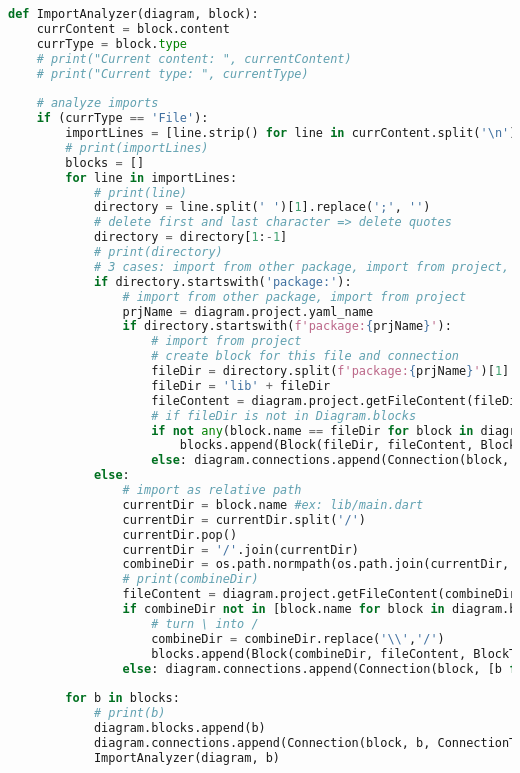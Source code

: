 \begin{lstlisting}[language=Python, caption={$\texttt{ImportAnalyzer}$ function.}, label={lst:9}]
def ImportAnalyzer(diagram, block):
    currContent = block.content
    currType = block.type
    # print("Current content: ", currentContent)
    # print("Current type: ", currentType)
    
    # analyze imports
    if (currType == 'File'):
        importLines = [line.strip() for line in currContent.split('\n') if line.strip().startswith('import')]
        # print(importLines)
        blocks = []
        for line in importLines:
            # print(line)
            directory = line.split(' ')[1].replace(';', '')
            # delete first and last character => delete quotes
            directory = directory[1:-1]
            # print(directory)
            # 3 cases: import from other package, import from project, import as relative path
            if directory.startswith('package:'):
                # import from other package, import from project
                prjName = diagram.project.yaml_name
                if directory.startswith(f'package:{prjName}'):
                    # import from project
                    # create block for this file and connection
                    fileDir = directory.split(f'package:{prjName}')[1]
                    fileDir = 'lib' + fileDir
                    fileContent = diagram.project.getFileContent(fileDir)
                    # if fileDir is not in Diagram.blocks
                    if not any(block.name == fileDir for block in diagram.blocks):
                        blocks.append(Block(fileDir, fileContent, BlockType.FILE))
                    else: diagram.connections.append(Connection(block, [b for b in diagram.blocks if b.name == fileDir][0], ConnectionType.IMPORT))
            else:
                # import as relative path
                currentDir = block.name #ex: lib/main.dart
                currentDir = currentDir.split('/')
                currentDir.pop()
                currentDir = '/'.join(currentDir)
                combineDir = os.path.normpath(os.path.join(currentDir, directory))
                # print(combineDir)
                fileContent = diagram.project.getFileContent(combineDir)
                if combineDir not in [block.name for block in diagram.blocks]:
                    # turn \ into /
                    combineDir = combineDir.replace('\\','/')
                    blocks.append(Block(combineDir, fileContent, BlockType.FILE))
                else: diagram.connections.append(Connection(block, [b for b in diagram.blocks if b.name == combineDir][0], ConnectionType.IMPORT))
        
        for b in blocks:
            # print(b)
            diagram.blocks.append(b)
            diagram.connections.append(Connection(block, b, ConnectionType.IMPORT))
            ImportAnalyzer(diagram, b)
\end{lstlisting}

